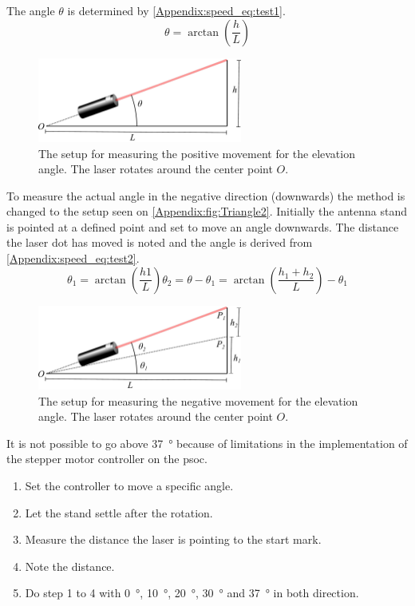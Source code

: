 The angle $\theta$ is determined by \autoref{Appendix:speed_eq:test1}.
\begin{equation}\label{Appendix:speed_eq:test1}
\theta = \arctan\left(\frac{h}{L}\right)    
\end{equation}

\begin{figure} [!h]
    \centering
        \includegraphics[width=0.6\textwidth]{figures/test/Triangle1}
        \caption{The setup for measuring the positive movement for the elevation angle. The laser rotates around the center point $O$.}
        \label{Appendix:fig:Triangle1}
\end{figure}

To measure the actual angle in the negative direction (downwards) the method is changed to the setup seen on \autoref{Appendix:fig:Triangle2}. Initially the antenna stand is pointed at a defined point and set to move an angle downwards. The distance the laser dot has moved is noted and the angle is derived from \autoref{Appendix:speed_eq:test2}.
\begin{equation}\label{Appendix:speed_eq:test2}
\theta_1 = \arctan\left(\frac{h1}{L}\right)
\theta_2 = \theta - \theta_1 = \arctan\left(\frac{h_1+h_2}{L}\right) - \theta_1
\end{equation}

\begin{figure} [h]
    \centering
        \includegraphics[width=0.6\textwidth]{figures/test/Triangle2}
        \caption{The setup for measuring the negative movement for the elevation angle. The laser rotates around the center point $O$.}
        \label{Appendix:fig:Triangle2}
\end{figure}

It is not possible to go above \SI{37}{\degree} because of limitations in the implementation of the stepper motor controller on the \gls{psoc}.
\begin{enumerate}
\item Set the controller to move a specific angle.
\item Let the stand settle after the rotation.
\item Measure the distance the laser is pointing to the start mark.
\item Note the distance.
\item Do step 1 to 4 with \SI{0}{\degree}, \SI{10}{\degree}, \SI{20}{\degree}, \SI{30}{\degree} and \SI{37}{\degree} in both direction.
\end{enumerate}


